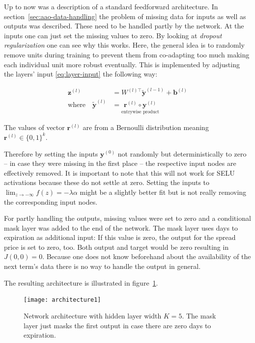 Up to now was a description of a standard feedforward architecture. In section~\ref{sec:aao-data-handling} the problem of missing data for inputs as well as outputs was described. These need to be handled partly by the network. At the inputs one can just set the missing values to zero. By looking at \emph{dropout regularization} one can see why this works. Here, the general idea is to randomly remove units during training to prevent them from co-adapting too much making each individual unit more robust eventually. This is implemented by adjusting the layers' input \ref{eq:layer-input} the following way: \cite{JMLR:v15:srivastava14a}

\begin{align}
	\mathbf{z}^{(l)} &= W^{(l)\top} \mathbf{\tilde{y}}^{(l-1)} + \mathbf{b}^{(l)} \\
	\text{where} \quad
	\mathbf{\tilde{y}}^{(l)} &= \underset{\text{entrywise product}}{\mathbf{r}^{(l)} \circ \mathbf{y}^{(l)}}
\end{align}

The values of vector $\mathbf{r}^{(l)}$ are from a Bernoulli distribution meaning $\mathbf{r}^{(l)} \in \{0, 1\}^k$.

Therefore by setting the inputs $\mathbf{y}^{(0)}$ not randomly but deterministically to zero -- in case they were missing in the first place -- the respective input nodes are effectively removed. It is important to note that this will not work for SELU activations because these do not settle at zero. Setting the inputs to $\lim_{z \to -\infty} f(z) = -\lambda \alpha$ might be a slightly better fit but is not really removing the corresponding input nodes.

For partly handling the outputs, missing values were set to zero and a conditional mask layer was added to the end of the network. The mask layer uses days to expiration as additional input: If this value is zero, the output for the spread price is set to zero, too. Both output and target would be zero resulting in $J(0, 0) = 0$. Because one does not know beforehand about the availability of the next term's data there is no way to handle the output in general.

The resulting architecture is illustrated in figure~\ref{fig:architecture1}.

\begin{figure}
	\centering
	\texttt{[image: architecture1]}
	\caption[Network architecture with hidden layer width $K=5$]{%
		Network architecture with hidden layer width $K=5$. The mask layer just masks the first output in case there are zero days to expiration.}
	\label{fig:architecture1}
\end{figure}

